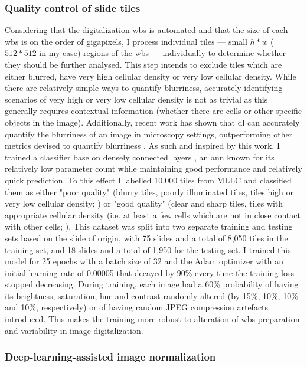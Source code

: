 \subsubsection{Quality control of slide tiles}

Considering that the digitalization \ac{wbs} is automated and that the size of each \ac{wbs} is on the order of gigapixels, I process individual tiles --- small $h*w$ ($512*512$ in my case) regions of the \ac{wbs} --- individually to determine whether they should be further analysed. This step intends to exclude tiles which are either blurred, have very high cellular density or very low cellular density. While there are relatively simple ways to quantify blurriness, accurately identifying scenarios of very high or very low cellular density is not as trivial as this generally requires contextual information (whether there are cells or other specific objects in the image). Additionally, recent work has shown that \ac{dl} can accurately quantify the blurriness of an image in microscopy settings, outperforming other metrics devised to quantify blurriness \cite{Yang2018-ve}. As such and inspired by this work, I trained a classifier base on densely connected layers \cite{huang2017densely}, an \ac{ann} known for its relatively low parameter count while maintaining good performance and relatively quick prediction. To this effect I labelled 10,000 tiles from MLLC and classified them as either "poor quality" (blurry tiles, poorly illuminated tiles, tiles high or very low cellular density; ) or "good quality" (clear and sharp tiles, tiles with appropriate cellular density (i.e. at least a few cells which are not in close contact with other cells; ). This dataset was split into two separate training and testing sets based on the slide of origin, with 75 slides and a total of 8,050 tiles in the training set, and 18 slides and a total of 1,950 for the testing set. I trained this model for 25 epochs with a batch size of 32 and the Adam optimizer with an initial learning rate of 0.00005 that decayed by 90\% every time the training loss stopped decreasing. During training, each image had a 60\% probability of having its brightness, saturation, hue and contrast randomly altered (by 15\%, 10\%, 10\% and 10\%, respectively) or of having random JPEG compression artefacts introduced. This makes the training more robust to alteration of \ac{wbs} preparation and variability in image digitalization.

\subsubsection{Deep-learning-assisted image normalization}

